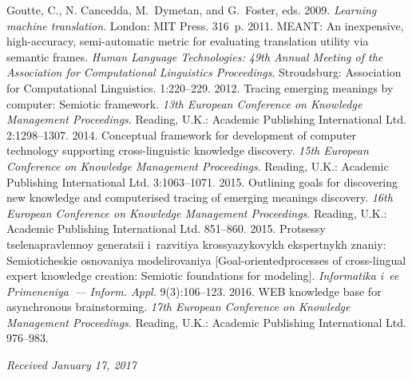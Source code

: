 \begin{multicols}{2}
{{\begin{thebibliography}{99}
\columnbreak
{}
Goutte, C., N. Cancedda, M.~Dymetan, and G.~Foster, eds. 2009. 
\textit{Learning machine translation}. London: MIT Press. 316~p.
 2011. MEANT: An inexpensive, high-accuracy, 
semi-automatic metric for evaluating translation utility via semantic frames. 
\textit{Human Language Technologies: 49th Annual Meeting of the 
Association for Computational Linguistics Proceedings}.  Stroudsburg: 
Association for Computational Linguistics. 1:220--229.
 2012. Tracing emerging meanings by computer: Semiotic 
framework. \textit{13th European Conference on Knowledge Management 
Proceedings}.  Reading, U.K.: Academic Publishing International Ltd.  
2:1298--1307.
 2014. Conceptual framework for development of 
computer technology supporting cross-linguistic knowledge discovery. 
\textit{15th European Conference on Knowledge Management Proceedings}.  
Reading, U.K.: Academic Publishing International Ltd. 3:1063--1071.
 2015. Outlining goals for discovering 
new knowledge and computerised tracing of emerging meanings discovery. 
\textit{16th European Conference on Knowledge Management Proceedings}. 
Reading, U.K.: Academic Publishing International Ltd.  
851--860.
 2015. Protsessy tselenapravlennoy ge\-ne\-ra\-tsii %
 i~razvitiya 
krossyazykovykh ekspertnykh znaniy: Se\-mi\-o\-ti\-che\-skie osnovaniya 
modelirovaniya [Goal-oriented\linebreak processes of cross-lingual expert knowledge 
creation: Semiotic foundations for modeling]. \textit{Informatika i~ee 
Primeneniya~--- Inform. Appl.} 9(3):106--123.
 2016. 
WEB knowledge base for asynchronous brainstorming. \textit{17th European 
Conference on Knowledge Management Proceedings}. Reading, U.K.: Academic 
Publishing International Ltd. 976--983.
\end{thebibliography}

 }
 }

\end{multicols}

\vspace*{-3pt}

\hfill{\small\textit{Received January 17, 2017}}


